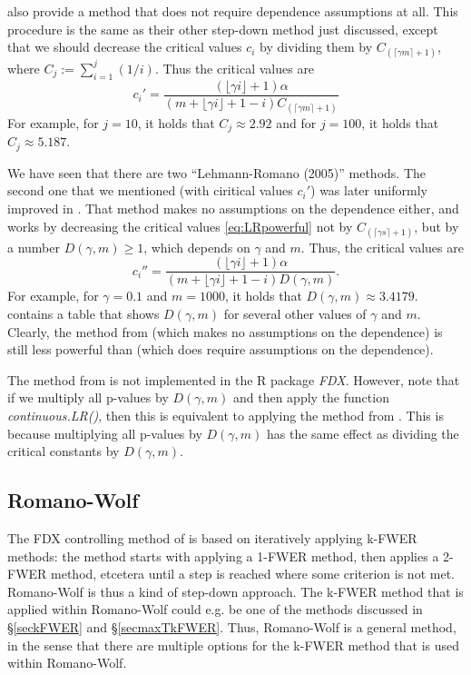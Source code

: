 \documentclass[11pt]{article}
\theoremstyle{plain}
\theoremstyle{definition}
\newcommand{\citt}{\citet}
\begin{document}
\citt[][p.1152]{lehmann2005generalizations} also provide a method that does not require dependence assumptions at all.
This procedure is the same as their other step-down method just discussed, except that we should decrease the critical values $c_i$ by dividing them by $C_{(\lceil \gamma m \rceil +1)}$, where $C_j := \sum_{i=1}^j (1/i)$. 
Thus the critical values are 
\begin{equation} \label{eq:LRgeneral}
c_i' = \frac{(\lfloor \gamma i \rfloor +1 )\alpha}{(m+\lfloor \gamma i \rfloor +1-i)C_{(\lceil \gamma m \rceil +1)} }
\end{equation} 
For example,
for $j=10$, it holds that  $C_j\approx 2.92$ and 
 for $j=100$, it holds that $C_j\approx 5.187$. 
 
 We have seen that there are two ``Lehmann-Romano (2005)'' methods.
 The second one that we mentioned (with ciritical values $c_i'$) was later uniformly improved in \citt[][Theorem 3.4]{romano2006stepdown}. That method makes no assumptions on the dependence either, and works by decreasing the critical values \eqref{eq:LRpowerful} not by $C_{(\lceil \gamma s \rceil +1)}$, but by a number $D(\gamma, m)\geq 1$, which depends on $\gamma$ and $m$. 
 Thus, the critical values are 
 \begin{equation} \label{eq:RS}
c_i'' = \frac{(\lfloor \gamma i \rfloor +1 )\alpha}{(m+\lfloor \gamma i \rfloor +1-i)D(\gamma, m)}.
\end{equation} 
 For example, for $\gamma=0.1$ and $m=1000$, it holds that  $D(\gamma, m)\approx 3.4179.$ \citt[][p.42]{romano2006stepdown} contains a table that shows $D(\gamma, m)$ for several other values of $\gamma$ and $m$. Clearly, the method from  \citt[][Theorem 3.4]{romano2006stepdown} (which makes no assumptions on the dependence) is still less powerful than \citt[][p.1148,1150]{lehmann2005generalizations} (which does require assumptions on the dependence).
 
 The method from \citt[][Theorem 3.4]{romano2006stepdown} is not implemented in the R package \emph{FDX}. However, note that if we multiply all p-values by $D(\gamma, m)$ and then apply the function \emph{continuous.LR()}, then this is equivalent to applying the method from \citt[][Theorem 3.4]{romano2006stepdown}. This is because  multiplying all p-values by $D(\gamma, m)$ has the same effect as dividing the critical constants by $D(\gamma, m)$.
 


\subsection{Romano-Wolf} \label{secRW}
The FDX controlling method of \citt{romano2007control} is based on iteratively applying k-FWER methods: the method starts with applying a 1-FWER method, then applies a 2-FWER method, etcetera until a step is reached where some criterion is not met. Romano-Wolf is thus a kind of step-down approach. The k-FWER method that is applied within Romano-Wolf could e.g. be one of the methods discussed in  \S\ref{seckFWER} and \S\ref{secmaxTkFWER}. Thus, Romano-Wolf is a general method, in the sense that there are multiple options for the k-FWER method that is used within Romano-Wolf.
\end{document}
